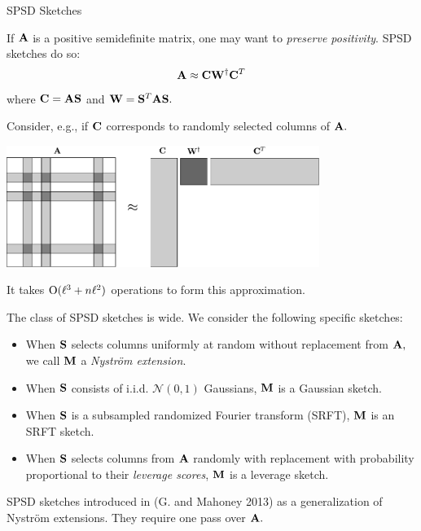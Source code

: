\documentclass[xcolor=x11names,compress,ignorenonframetext]{beamer}
\renewcommand{\(}{\begin{columns}}
\renewcommand{\)}{\end{columns}}
\newcommand{\<}[1]{\begin{column}{#1}}
\renewcommand{\>}{\end{column}}
\def\refcolor{DodgerBlue4}
\newcommand{\refer}[1]{({\color{\refcolor}#1})}
\begin{document}
 \begin{frame}{SPSD Sketches}
 
 If $\mathbf{A}$ is a positive semidefinite matrix, one may want to \emph{preserve positivity}. 
 SPSD sketches do so:
  \[
   \mathbf{A} \approx \mathbf{C} \mathbf{W}^\dagger \mathbf{C}^T
  \]
  where $\mathbf{C} = \mathbf{A} \mathbf{S}$ and $\mathbf{W} = \mathbf{S}^T \mathbf{A} \mathbf{S}.$

Consider, e.g., if $\mathbf{C}$ corresponds to randomly selected columns of $\mathbf{A}.$
\centerline{\includegraphics[width=4in,keepaspectratio=true]{nystrom-procedure}}

It takes $\mathrm{O}(\ell^3 + n \ell^2)$ operations to form this approximation.
\end{frame}

\begin{frame}
The class of SPSD sketches is wide. We consider the following specific sketches:
 \begin{itemize}
  \item When $\mathbf{S}$ selects columns uniformly at random without replacement from $\mathbf{A},$ 
   we call $\mathbf{M}$ a \textcolor{dgreen}{\emph{Nystr\"om extension}}.
  \item When $\mathbf{S}$ consists of i.i.d. $\mathcal{N}(0,1)$ Gaussians, $\mathbf{M}$ is a \textcolor{dgreen}{Gaussian sketch}.
  \item When $\mathbf{S}$ is a subsampled randomized Fourier transform (SRFT), $\mathbf{M}$ is an \textcolor{dgreen}{SRFT sketch}.
  \item When $\mathbf{S}$ selects columns from $\mathbf{A}$ randomly with replacement with probability proportional to their 
   \emph{leverage scores}, $\mathbf{M}$ is a \textcolor{dgreen}{leverage sketch}.
 \end{itemize}

 SPSD sketches introduced in \refer{G. and Mahoney 2013} as a generalization of Nystr\"om extensions. They require
 one pass over $\mathbf{A}.$
\end{frame}

% 
% 
%  
% 
% 
\end{document}
